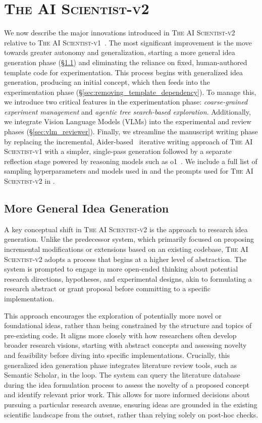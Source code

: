 \documentclass[11pt, a4paper]{include/gdm_format}
\newcommand{\oldalgo}{\textsc{The AI Scientist-v1}\xspace}
\newcommand{\ouralgo}{\textsc{The AI Scientist-v2}\xspace}
\begin{document}
%
\section{\ouralgo}
\label{sec:main_aisci_design}

We now describe the major innovations introduced in \ouralgo relative to \oldalgo~\citep{lu2024ai}.
The most significant improvement is the move towards greater autonomy and generalization, starting a more general idea generation phase (\S\ref{sec:generalized_idea_gen}) and eliminating the reliance on fixed, human-authored template code for experimentation.
This process begins with generalized idea generation, producing an initial concept, which then feeds into the experimentation phase (\S\ref{sec:removing_template_dependency}).
To manage this, we introduce two critical features in the experimentation phase: \emph{coarse-grained experiment management} and \emph{agentic tree search-based exploration}.
Additionally, we integrate Vision Language Models (VLMs) into the experimental and review phases (\S\ref{sec:vlm_reviewer}).
Finally, we streamline the manuscript writing phase by replacing the incremental, Aider-based~\citep{gauthier2024aider} iterative writing approach of \oldalgo with a simpler, single-pass generation followed by a separate reflection stage powered by reasoning models such as o1~\citep{OpenAIOS}.
We include a full list of sampling hyperparameters and models used in  and the prompts used for \ouralgo in .

\subsection{More General Idea Generation}
\label{sec:generalized_idea_gen}
A key conceptual shift in \ouralgo is the approach to research idea generation. Unlike the predecessor system, which primarily focused on proposing incremental modifications or extensions based on an existing codebase, \ouralgo adopts a process that begins at a higher level of abstraction. The system is prompted to engage in more open-ended thinking about potential research directions, hypotheses, and experimental designs, akin to formulating a research abstract or grant proposal before committing to a specific implementation.

This approach encourages the exploration of potentially more novel or foundational ideas, rather than being constrained by the structure and topics of pre-existing code. It aligns more closely with how researchers often develop broader research visions, starting with abstract concepts and assessing novelty and feasibility before diving into specific implementations.
Crucially, this generalized idea generation phase integrates literature review tools, such as Semantic Scholar, in the loop. The system can query the literature database during the idea formulation process to assess the novelty of a proposed concept and identify relevant prior work. This allows for more informed decisions about pursuing a particular research avenue, ensuring ideas are grounded in the existing scientific landscape from the outset, rather than relying solely on post-hoc checks.
\end{document}

